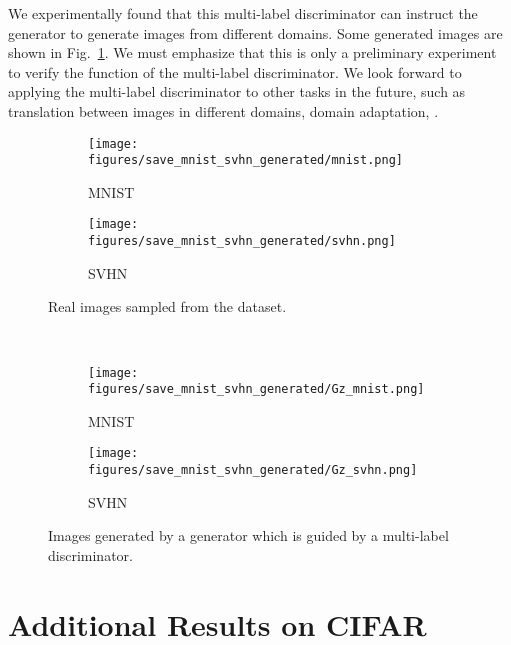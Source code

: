 \documentclass[paper_2425.tex]{subfiles}
\begin{document}
We experimentally found that this multi-label discriminator can instruct the generator to generate images from different domains. Some generated images are shown in Fig.~\ref{apx:fig:generated_mnist_svhn}. We must emphasize that this is only a preliminary experiment to verify the function of the multi-label discriminator. We look forward to applying the multi-label discriminator to other tasks in the future, such as translation between images in different domains, domain adaptation, \etc.



\begin{figure}[tbp]
  \centering
  \begin{minipage}[t]{\linewidth}
    \begin{subfigure}{0.49\linewidth}
      \centering
\texttt{[image: figures/save\_mnist\_svhn\_generated/mnist.png]}
\caption{MNIST}
\end{subfigure}
    \begin{subfigure}{0.49\linewidth}
      \centering
\texttt{[image: figures/save\_mnist\_svhn\_generated/svhn.png]}
\caption{SVHN}
\end{subfigure}
    \vspace{-0.3cm}
    \caption{Real images sampled from the dataset.}
    \vspace{0.5cm}
    \label{apx:fig:mnist_svhn}
  \end{minipage}\\
  \begin{minipage}[t]{\linewidth}
    \begin{subfigure}{0.49\linewidth}
      \centering
\texttt{[image: figures/save\_mnist\_svhn\_generated/Gz\_mnist.png]}
\caption{MNIST}
\end{subfigure}
    \begin{subfigure}{0.49\linewidth}
      \centering
\texttt{[image: figures/save\_mnist\_svhn\_generated/Gz\_svhn.png]}
\caption{SVHN}
\end{subfigure}
    \vspace{-0.3cm}
    \caption{Images generated by a generator which is guided by a multi-label discriminator.}
    \vspace{0.5cm}
    \label{apx:fig:generated_mnist_svhn}
  \end{minipage}
\end{figure}





\section{Additional Results on CIFAR}
\label{apx:sec:results_cifar}
\end{document}
